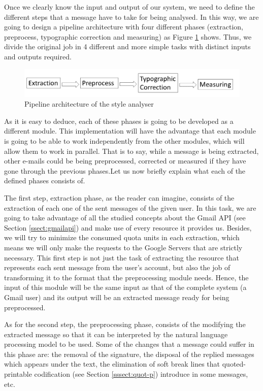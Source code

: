 Once we clearly know the input and output of our system, we need to define the different steps that a message have to take for being analysed. In this way, we are going to design a pipeline architecture with four different phases (extraction, preprocess, typographic correction and measuring) as Figure \ref{fig:arch} shows. Thus, we divide the original job in 4 different and more simple tasks with distinct inputs and outputs required.

\begin{figure}[h]
	\centering%
	\includegraphics[width = 1\textwidth]{Imagenes/Bitmap/architecture.png}%
	\caption{Pipeline architecture of the style analyser}%
	\label{fig:arch}
\end{figure}

As it is easy to deduce, each of these phases is going to be developed as a different module. This implementation will have the advantage that each module is going to be able to work independently from the other modules, which will allow them to work in parallel. That is to say, while a message is being extracted, other e-mails could be being preprocessed, corrected or measured if they have gone through the previous phases.Let us now briefly explain what each of the defined phases consists of.

The first step, extraction phase, as the reader can imagine, consists of the extraction of each one of the sent messages of the given user. In this task, we are going to take advantage of all the studied concepts about the Gmail API (see Section \ref{ssect:gmailapi}) and make use of every resource it provides us. Besides, we will try to minimize the consumed quota units in each extraction, which means we will only make the requests to the Google Servers that are strictly necessary. This first step is not just the task of extracting the resource that represents each sent message from the user's account, but also the job of transforming it to the format that the preprocessing module needs. Hence, the input of this module will be the same input as that of the complete system (a Gmail user) and its output will be an extracted message ready for being preprocessed.

As for the second step, the preprocessing phase, consists of the modifying the extracted message so that it can be interpreted by the natural language processing model to be used. Some of the changes that a message could suffer in this phase are: the removal of the signature, the disposal of the replied messages which appears under the text, the elimination of soft break lines that quoted-printable codification (see Section \ref{sssect:quot-p}) introduce in some messages, etc.

